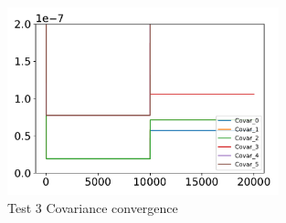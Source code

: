 \begin{figure}[htbp]\centerline{\includegraphics[width=0.7\textwidth, keepaspectratio]{AutoTeX/Test32}}\caption{Test 3 Covariance convergence}\label{fig:Test32}\end{figure}
